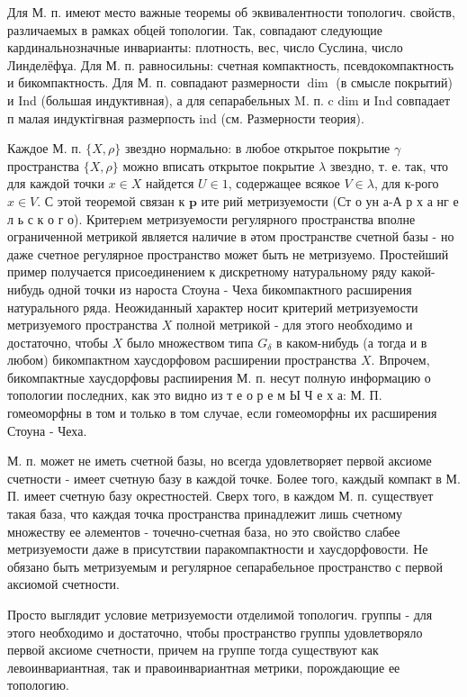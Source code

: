 \documentclass[10pt]{article}
\begin{document}
Для М. п. имеют место важные теоремы об эквивалентности топологич. свойств, различаемых в рамках обцей топологии. Так, совпадают следующие кардинальнозначные инварианты: плотность, вес, число Суслина, число Линделёфұа. Для М. п. равносильны: счетная компактность, псевдокомпактность и бикомпактность. Для М. п. совпадают размерности $\operatorname{dim}$ (в смысле покрытий) и Ind (большая индуктивная), а для сепарабельных M. п. c dim и Ind совпадает п малая индуктігвная размерпость ind (см. Размерности теория).



Каждое М. п. $\{X, \rho\}$ звездно нормально: в любое открытое покрытие $\gamma$ пространства $\{X, \rho\}$ можно вписать открытое покрытие $\lambda$ звездно, т. е. так, что для каждой точки $x \in X$ найдется $U \in \mathcal{1}$, содержащее всякое $V \in \lambda$, для к-рого $x \in V$. С этой теоремой связан к $\mathbf{p}$ ите рий метризуемости (Ст о ун а-А р х а нг е л ь с к о г о). Критерıем метризуемости регулярного пространства вполне ограниченной метрикой является наличие в әтом пространстве счетной базы - но даже счетное регулярное пространство может быть не метризуемо. Простейший пример получается присоединением к дискретному натуральному ряду какой-нибудь одной точки из нароста Стоуна - Чеха бикомпактного расширения натурального ряда. Неожиданный характер носит критерий метризуемости метризуемого пространства $X$ полной метрикой - для этого необходимо и достаточно, чтобы $X$ было множеством типа $G_{\delta}$ в каком-нибудь (а тогда и в любом) бикомпактном хаусдорфовом расширении пространства $X$. Впрочем, бикомпактные хаусдорфовы распиирения М. п. несут полную информацию о топологии последних, как это видно из т е о р е м Ы Ч е х а: М. П. гомеоморфны в том и только в том случае, если гомеоморфны их расширения Стоуна - Чеха.



М. п. может не иметь счетной базы, но всегда удовлетворяет первой аксиоме счетности - имеет счетную базу в каждой точке. Более того, каждый компакт в М. П. имеет счетную базу окрестностей. Сверх того, в каждом М. п. существует такая база, что каждая точка пространства принадлежит лишь счетному множеству ее әлементов - точечно-счетная база, но это свойство слабее метризуемости даже в присутствии паракомпактности и хаусдорфовости. Не обязано быть метризуемым и регулярное сепарабельное пространство с первой аксиомой счетности.



Просто выглядит условие метризуемости отделимой топологич. группы - для этого необходимо и достаточно, чтобы пространство группы удовлетворяло первой аксиоме счетности, причем на группе тогда существуют как левоинвариантная, так и правоинвариантная метрики, порождающие ее топологию.
\end{document}
